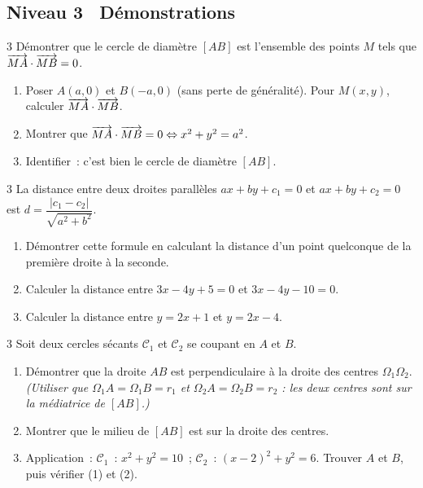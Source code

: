 \subsection*{\quad Niveau 3 \textemdash\ D\'emonstrations}

\begin{exo}{3}
D\'emontrer que le cercle de diam\`etre $[AB]$ est l'ensemble des
points $M$ tels que $\overrightarrow{MA}\cdot\overrightarrow{MB}=0$.
\begin{enumerate}
  \item Poser $A(a,0)$ et $B(-a,0)$ (sans perte de g\'en\'eralit\'e).
        Pour $M(x,y)$, calculer $\overrightarrow{MA}\cdot\overrightarrow{MB}$.
  \item Montrer que $\overrightarrow{MA}\cdot\overrightarrow{MB}=0 \Leftrightarrow x^2+y^2=a^2$.
  \item Identifier~: c'est bien le cercle de diam\`etre $[AB]$.
\end{enumerate}
\end{exo}

\begin{exo}{3}
La distance entre deux droites parall\`eles $ax+by+c_1=0$ et $ax+by+c_2=0$
est $d = \dfrac{|c_1-c_2|}{\sqrt{a^2+b^2}}$.
\begin{enumerate}
  \item D\'emontrer cette formule en calculant la distance d'un point
        quelconque de la premi\`ere droite \`a la seconde.
  \item Calculer la distance entre $3x-4y+5=0$ et $3x-4y-10=0$.
  \item Calculer la distance entre $y=2x+1$ et $y=2x-4$.
\end{enumerate}
\end{exo}

\begin{exo}{3}
Soit deux cercles s\'ecants $\mathcal{C}_1$ et $\mathcal{C}_2$ se coupant
en $A$ et $B$.
\begin{enumerate}
  \item D\'emontrer que la droite $AB$ est perpendiculaire \`a la droite
        des centres $\Omega_1\Omega_2$.
        \emph{(Utiliser que $\Omega_1A=\Omega_1B=r_1$ et
        $\Omega_2A=\Omega_2B=r_2$ : les deux centres sont sur la
        m\'ediatrice de $[AB]$.)}
  \item Montrer que le milieu de $[AB]$ est sur la droite des centres.
  \item Application~: $\mathcal{C}_1$~: $x^2+y^2=10$~;
        $\mathcal{C}_2$~: $(x-2)^2+y^2=6$.
        Trouver $A$ et $B$, puis v\'erifier (1) et (2).
\end{enumerate}
\end{exo}

